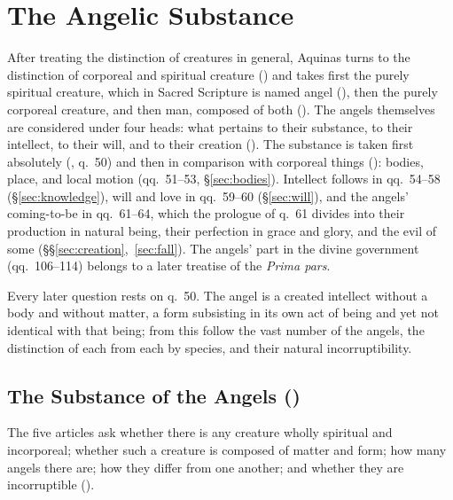 \section{The Angelic Substance}\label{sec:substance}

After treating the distinction of creatures in general, Aquinas turns to
the distinction of corporeal and spiritual creature () and takes first the
purely spiritual creature, which in Sacred Scripture is named angel
(), then the purely corporeal creature, and then man, composed of
both (). The angels themselves are considered under four
heads: what pertains to their substance, to their intellect, to their will,
and to their creation (). The substance is taken
first absolutely (, q.~50) and then in comparison with
corporeal things (): bodies, place, and local
motion (qq.~51--53, \S\ref{sec:bodies}). Intellect follows in qq.~54--58
(\S\ref{sec:knowledge}), will and love in qq.~59--60 (\S\ref{sec:will}),
and the angels' coming-to-be in qq.~61--64, which the prologue of q.~61
divides into their production in natural being, their perfection in grace
and glory, and the evil of some (\S\S\ref{sec:creation},~\ref{sec:fall}).
The angels' part in the divine government (qq.~106--114) belongs to a later
treatise of the \emph{Prima pars}.

Every later question rests on q.~50. The angel is a created intellect
without a body and without matter, a form subsisting in its own act of
being and yet not identical with that being; from this follow the vast
number of the angels, the distinction of each from each by species, and
their natural incorruptibility.

\subsection{The Substance of the Angels ()}\label{sec:q50}

The five articles ask whether there is any creature wholly spiritual and
incorporeal; whether such a creature is composed of matter and form; how
many angels there are; how they differ from one another; and whether they
are incorruptible ().

